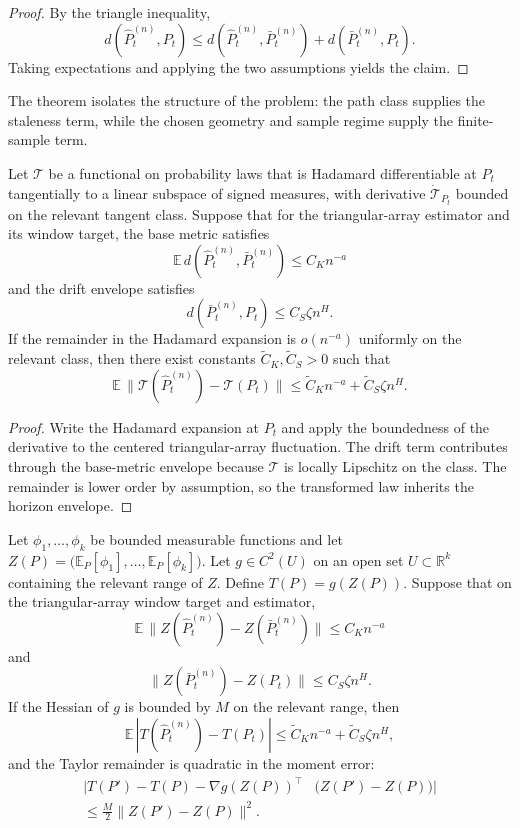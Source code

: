 \begin{proof}
By the triangle inequality,
\[
  d\!\left(\widehat P_t^{(n)},P_t\right)
  \le
  d\!\left(\widehat P_t^{(n)},\bar P_t^{(n)}\right)
  + d\!\left(\bar P_t^{(n)},P_t\right).
\]
Taking expectations and applying the two assumptions yields the claim.
\end{proof}

The theorem isolates the structure of the problem:
the path class supplies the staleness term, while the chosen geometry and sample
regime supply the finite-sample term.

\begin{proposition}
\label{prop:hadamard_triangular_transfer}
Let $\mathcal T$ be a functional on probability laws that is Hadamard
differentiable at $P_t$ tangentially to a linear subspace of signed measures, with
derivative $\dot{\mathcal T}_{P_t}$ bounded on the relevant tangent class. Suppose
that for the triangular-array estimator and its window target, the base metric
satisfies
\[
  \mathbb E\,d\!\left(\widehat P_t^{(n)},\bar P_t^{(n)}\right) \le C_K n^{-a}
\]
and the drift envelope satisfies
\[
  d\!\left(\bar P_t^{(n)},P_t\right) \le C_S\zeta n^H.
\]
If the remainder in the Hadamard expansion is $o(n^{-a})$ uniformly on the
relevant class, then there exist constants $\widetilde C_K,\widetilde C_S>0$
such that
\[
  \mathbb E\,\bigl\|\mathcal T(\widehat P_t^{(n)})-\mathcal T(P_t)\bigr\|
  \le \widetilde C_K n^{-a} + \widetilde C_S\zeta n^H.
\]
\end{proposition}

\begin{proof}
Write the Hadamard expansion at $P_t$ and apply the boundedness of the derivative
to the centered triangular-array fluctuation. The drift term contributes through
the base-metric envelope because $\mathcal T$ is locally Lipschitz on
the class. The remainder is lower order by assumption, so the transformed law
inherits the horizon envelope.
\end{proof}

\begin{proposition}
\label{prop:smooth_finite_dimensional_transfer}
Let $\phi_1,\dots,\phi_k$ be bounded measurable functions and let
$Z(P)=\bigl(\mathbb E_P[\phi_1],\dots,\mathbb E_P[\phi_k]\bigr)$. Let
$g\in C^2(U)$ on an open set $U\subset\mathbb R^k$ containing the relevant
range of $Z$. Define $T(P)=g(Z(P))$. Suppose that on the triangular-array window
target and estimator,
\[
  \mathbb E\,\|Z(\widehat P_t^{(n)})-Z(\bar P_t^{(n)})\| \le C_K n^{-a}
\]
and
\[
  \|Z(\bar P_t^{(n)})-Z(P_t)\| \le C_S\zeta n^H.
\]
If the Hessian of $g$ is bounded by $M$ on the relevant range, then
\[
  \mathbb E\,|T(\widehat P_t^{(n)})-T(P_t)|
  \le \widetilde C_K n^{-a} + \widetilde C_S\zeta n^H,
\]
and the Taylor remainder is quadratic in the moment error:
\[
  \begin{aligned}
  |T(P')-T(P)-\nabla g(Z(P))^\top &\bigl(Z(P')-Z(P)\bigr)| \\
  \le \frac{M}{2}\|Z(P')-Z(P)\|^2.
  \end{aligned}
\]
\end{proposition}

